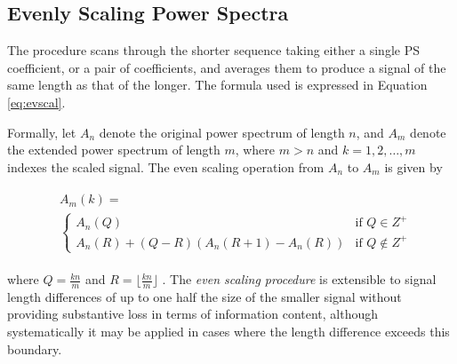 \documentclass[10pt,conference]{IEEEtran}
\begin{document}
\subsection{Evenly Scaling Power Spectra} 
\noindent  The procedure scans through the shorter sequence taking either a single PS coefficient, or a pair of coefficients, and 
averages them to produce a signal of the same length as that of the longer.  
The formula used is expressed in Equation \ref{eq:evscal}. 

Formally, let $A_n$ denote the original power spectrum of length $n$, and $A_m$ denote the extended power spectrum of length $m$, where $m > n$ and $k=1,2,\dots,m$ indexes the scaled signal. The even scaling operation from $A_n$ to $A_m$ is given by

\begin{align}
\begin{split}
&A_m(k)=\\
&\begin{cases} A_n(Q) & \mbox{if } Q\in Z^+\\
 A_n(R) + (Q-R)(A_n(R+1)-A_n(R)) & \mbox{if } Q  \notin Z^+
\end{cases}
\label{eq:evscal}
\end{split}
\end{align}


\noindent where $Q = \frac{kn}{m}$ and $R = \lfloor \frac{kn}{m} \rfloor$ \cite{yin15}. The \textit{even scaling procedure} is extensible to signal length differences of up to one half the size of the smaller signal without providing substantive loss in terms of information content, although systematically it may be applied in cases where the length difference exceeds this boundary.
\end{document}
